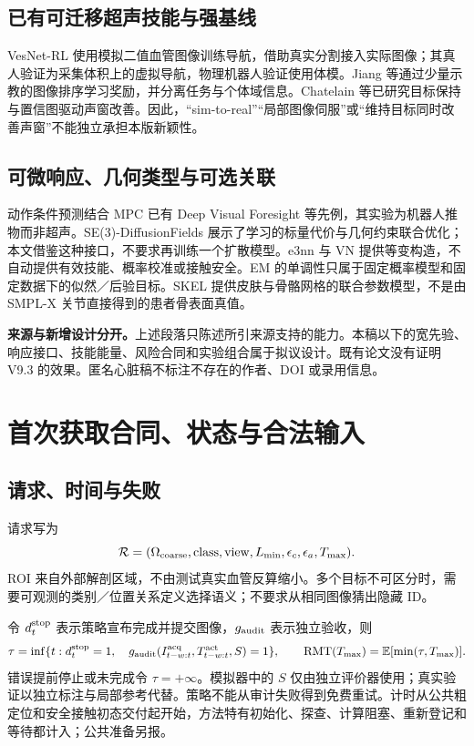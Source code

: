 \documentclass[UTF8,fontset=fandol,11pt,a4paper]{ctexart}
\theoremstyle{plain}
\theoremstyle{definition}
\theoremstyle{remark}
\numberwithin{equation}{section}
\newcommand{\E}{\mathbb E}
\newcommand{\cR}{\mathcal R}
\begin{document}
\subsection{已有可迁移超声技能与强基线}
VesNet-RL 使用模拟二值血管图像训练导航，借助真实分割接入实际图像；其真人验证为采集体积上的虚拟导航，物理机器人验证使用体模\cite{vesnet}。Jiang 等通过少量示教的图像排序学习奖励，并分离任务与个体域信息\cite{sonographer}。Chatelain 等已研究目标保持与置信图驱动声窗改善\cite{confidence}。因此，“sim-to-real”“局部图像伺服”或“维持目标同时改善声窗”不能独立承担本版新颖性。

\subsection{可微响应、几何类型与可选关联}
动作条件预测结合 MPC 已有 Deep Visual Foresight 等先例，其实验为机器人推物而非超声\cite{foresight}。SE(3)-DiffusionFields 展示了学习的标量代价与几何约束联合优化\cite{difffields}；本文借鉴这种接口，不要求再训练一个扩散模型。e3nn 与 VN 提供等变构造\cite{e3nn,vn}，不自动提供有效技能、概率校准或接触安全。EM 的单调性只属于固定概率模型和固定数据下的似然／后验目标\cite{em}。SKEL 提供皮肤与骨骼网格的联合参数模型\cite{skel}，不是由 SMPL-X 关节直接得到的患者骨表面真值。

\begin{scopebox}
\textbf{来源与新增设计分开。}上述段落只陈述所引来源支持的能力。本稿以下的宽先验、响应接口、技能能量、风险合同和实验组合属于拟议设计。既有论文没有证明 V9.3 的效果。匿名心脏稿不标注不存在的作者、DOI 或录用信息。
\end{scopebox}

\section{首次获取合同、状态与合法输入}
\label{sec:contract}
\subsection{请求、时间与失败}
请求写为
\begin{equation}
\cR=(\Omega_{\rm coarse},\mathrm{class},\mathrm{view},L_{\min},\epsilon_c,\epsilon_a,T_{\max}).
\end{equation}
ROI 来自外部解剖区域，不由测试真实血管反算缩小。多个目标不可区分时，需要可观测的类别／位置关系定义选择语义；不要求从相同图像猜出隐藏 ID。

令 $d_t^{\rm stop}$ 表示策略宣布完成并提交图像，$g_{\rm audit}$ 表示独立验收，则
\begin{equation}
\tau=\inf\{t:d_t^{\rm stop}=1,\quad
 g_{\rm audit}(I^{\rm acq}_{t-w:t},T^{\rm act}_{t-w:t},S)=1\},\qquad
\mathrm{RMT}(T_{\max})=\E[\min(\tau,T_{\max})].
\label{eq:first}
\end{equation}
错误提前停止或未完成令 $\tau=+\infty$。模拟器中的 $S$ 仅由独立评价器使用；真实验证以独立标注与局部参考代替。策略不能从审计失败得到免费重试。计时从公共粗定位和安全接触初态交付起开始，方法特有初始化、探查、计算阻塞、重新登记和等待都计入；公共准备另报。
\end{document}

